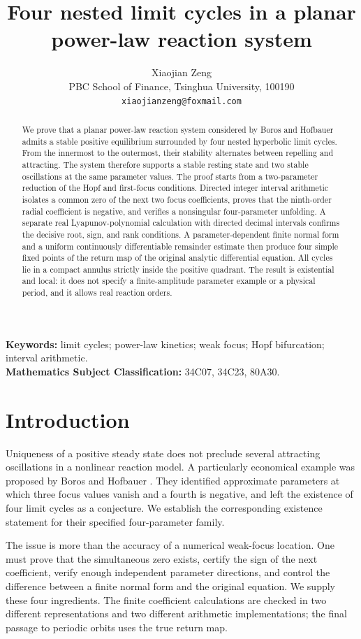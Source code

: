 \documentclass[11pt,a4paper]{article}
\title{Four nested limit cycles in a planar\texorpdfstring{\\}{ }power-law reaction system}
\author{Xiaojian Zeng\\[3pt]
\small PBC School of Finance, Tsinghua University, 100190\\
\small \texttt{xiaojianzeng@foxmail.com}}
\date{}
\theoremstyle{remark}
\numberwithin{equation}{section}
\begin{document}
\maketitle
\begin{abstract}
We prove that a planar power-law reaction system considered by Boros and
Hofbauer admits a stable positive equilibrium surrounded by four nested
hyperbolic limit cycles. From the innermost to the outermost, their
stability alternates between repelling and attracting. The system
therefore supports a stable resting state and two stable oscillations at
the same parameter values. The proof starts from a two-parameter
reduction of the Hopf and first-focus conditions. Directed integer
interval arithmetic isolates a common zero of the next two focus
coefficients, proves that the ninth-order radial coefficient is negative,
and verifies a nonsingular four-parameter unfolding. A separate real
Lyapunov-polynomial calculation with directed decimal intervals confirms
the decisive root, sign, and rank conditions. A parameter-dependent finite
normal form and a uniform continuously differentiable remainder estimate
then produce four simple fixed points of the return map of the original
analytic differential equation. All cycles lie in a compact annulus
strictly inside the positive quadrant. The result is existential and
local: it does not specify a finite-amplitude parameter example or a
physical period, and it allows real reaction orders.
\end{abstract}
\noindent\textbf{Keywords:} limit cycles; power-law kinetics; weak focus;
Hopf bifurcation; interval arithmetic.\\
\textbf{Mathematics Subject Classification:} 34C07, 34C23, 80A30.

\section{Introduction}
Uniqueness of a positive steady state does not preclude several attracting
oscillations in a nonlinear reaction model. A particularly economical
example was proposed by Boros and Hofbauer \cite[Section~5.1]{BorosHofbauer2024}.
They identified approximate parameters at which three focus values vanish
and a fourth is negative, and left the existence of four limit cycles
as a conjecture. We establish the corresponding existence statement for
their specified four-parameter family.

The issue is more than the accuracy of a numerical weak-focus location.
One must prove that the simultaneous zero exists, certify the sign of the
next coefficient, verify enough independent parameter directions, and
control the difference between a finite normal form and the original
equation. We supply these four ingredients. The finite coefficient
calculations are checked in two different representations and two
different arithmetic implementations; the final passage to periodic
orbits uses the true return map.
\end{document}
